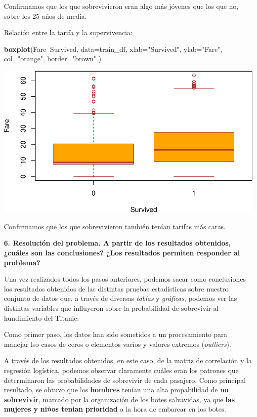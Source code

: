 \documentclass[]{article}
\newenvironment{Shaded}{\begin{snugshade}}{\end{snugshade}}
\newcommand{\DataTypeTok}[1]{\textcolor[rgb]{0.13,0.29,0.53}{#1}}
\newcommand{\KeywordTok}[1]{\textcolor[rgb]{0.13,0.29,0.53}{\textbf{#1}}}
\newcommand{\NormalTok}[1]{#1}
\newcommand{\OperatorTok}[1]{\textcolor[rgb]{0.81,0.36,0.00}{\textbf{#1}}}
\newcommand{\StringTok}[1]{\textcolor[rgb]{0.31,0.60,0.02}{#1}}
\begin{document}
Confirmamos que los que sobrevivieron eran algo más jóvenes que los que
no, sobre los 25 años de media.

Relación entre la tarifa y la supervivencia:

\begin{Shaded}
\begin{Highlighting}[]
\KeywordTok{boxplot}\NormalTok{(Fare}\OperatorTok{~}\NormalTok{Survived,}
\DataTypeTok{data=}\NormalTok{train_df,}
\DataTypeTok{xlab=}\StringTok{"Survived"}\NormalTok{,}
\DataTypeTok{ylab=}\StringTok{"Fare"}\NormalTok{,}
\DataTypeTok{col=}\StringTok{"orange"}\NormalTok{,}
\DataTypeTok{border=}\StringTok{"brown"}
\NormalTok{)}
\end{Highlighting}
\end{Shaded}

\includegraphics{titanic_data_analysis_PRA2_files/figure-latex/unnamed-chunk-31-1.pdf}

Confirmamos que los que sobrevivieron también tenían tarifas más caras.

\textbf{6. Resolución del problema. A partir de los resultados
obtenidos, ¿cuáles son las conclusiones? ¿Los resultados permiten
responder al problema?}

Una vez realizados todos los pasos anteriores, podemos sacar como
conclusiones los resultados obtenidos de las distintas pruebas
estadísticas sobre nuestro conjunto de datos que, a través de diversas
\emph{tablas} y \emph{gráficas}, podemos ver las distintas variables que
influyeron sobre la probabilidad de sobrevivir al hundimiento del
Titanic.

Como primer paso, los datos han sido sometidos a un procesamiento para
manejar lso casos de ceros o elementos vacíos y valores extremos
(\emph{outliers}).

A través de los resultados obtenidos, en este caso, de la matriz de
correlación y la regresión logística, podemos observar claramente cuáles
eran los patrones que determinaron las probabilidades de sobrevivir de
cada pasajero. Como principal resultado, se obtuvo que los
\textbf{hombres} tenían una alta propabilidad de \textbf{no sobrevivir},
marcado por la organización de los botes salvavidas, ya que \textbf{las
mujeres y niños tenian prioridad} a la hora de embarcar en los botes.
\end{document}
